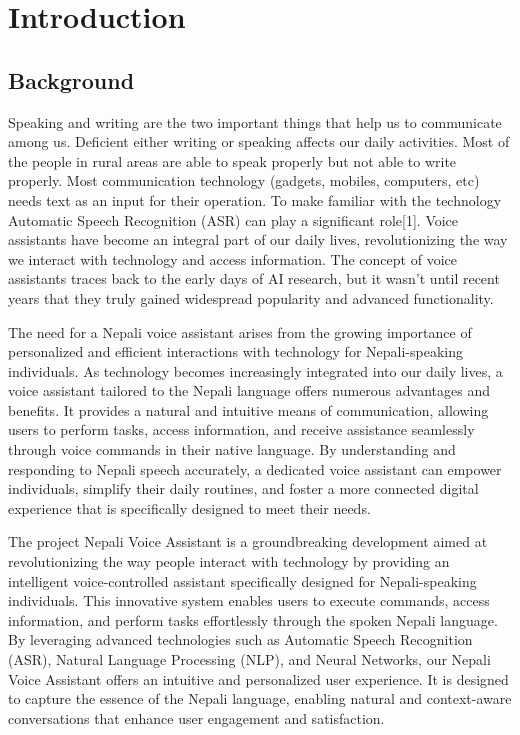 

\newpage
{} %

\chapter{Introduction}
\section{Background}\label{sec:bkgrnd}%
Speaking and writing are the two important things that help us to communicate among us.
Deficient either writing or speaking affects our daily activities. Most of the people in
rural areas are able to speak properly but not able to write properly. Most communication technology (gadgets, mobiles, computers, etc) needs text as an input for their operation. To
make familiar with the technology Automatic Speech Recognition (ASR) can play a significant role[1]. Voice assistants have become an integral part of our daily lives, revolutionizing the way we interact with technology and access information. The concept of voice assistants traces back to the early days of AI  research, but it wasn't until recent years that they truly gained widespread popularity and advanced functionality.

The need for a Nepali voice assistant arises from the growing importance of personalized and efficient interactions with technology for Nepali-speaking individuals. As technology becomes increasingly integrated into our daily lives, a voice assistant tailored to the Nepali language offers numerous advantages and benefits. It provides a natural and intuitive means of communication, allowing users to perform tasks, access information, and receive assistance seamlessly through voice commands in their native language. By understanding and responding to Nepali speech accurately, a dedicated voice assistant can empower individuals, simplify their daily routines, and foster a more connected digital experience that is specifically designed to meet their needs.

The project Nepali Voice Assistant is a groundbreaking development aimed at revolutionizing the way people interact with technology by providing an intelligent voice-controlled assistant specifically designed for Nepali-speaking individuals. This innovative system enables users to execute commands, access information, and perform tasks effortlessly through the spoken Nepali language. By leveraging advanced technologies such as Automatic Speech Recognition (ASR), Natural Language Processing (NLP), and Neural Networks, our Nepali Voice Assistant offers an intuitive and personalized user experience. It is designed to capture the essence of the Nepali language, enabling natural and context-aware conversations that enhance user engagement and satisfaction.


